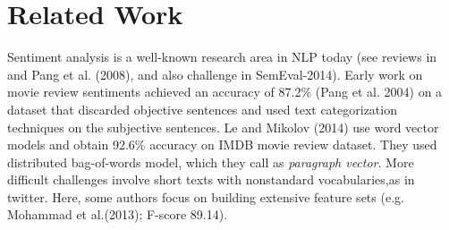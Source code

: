 \def\DevnagVersion{2.15}\documentclass[11pt]{article}
\begin{document}


\section{Related Work}
\label{sec:related}
Sentiment analysis is a well-known research area in NLP today (see reviews in~\cite{Liu:12} and Pang et al. (2008), and also
challenge in SemEval-2014).  Early work on movie review sentiments achieved an accuracy of 87.2\% (Pang et al. 2004) on a dataset that discarded objective sentences and used text categorization techniques
on the subjective sentences. Le and Mikolov (2014) use word vector models and obtain 92.6\% accuracy on IMDB movie review dataset.
They used distributed bag-of-words model, which they call as \emph{paragraph vector}. More difficult challenges involve short texts with nonstandard vocabularies,as in twitter.  Here, some authors focus on building extensive feature sets (e.g. Mohammad et al.(2013); F-score 89.14). \\
\end{document}
